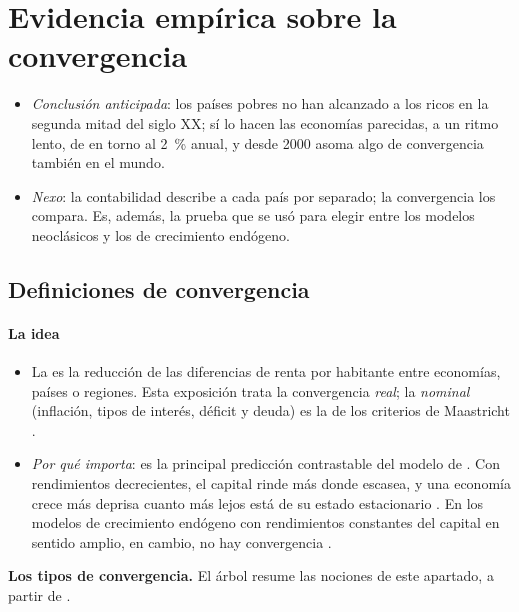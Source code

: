 \documentclass[11pt]{article}
\begin{document}
\section{Evidencia empírica sobre la convergencia}\label{sec:convergencia}

\begin{itemize}
\item \emph{Conclusión anticipada}: los países pobres no han alcanzado a los ricos en la segunda mitad del siglo XX; sí lo hacen las economías parecidas, a un ritmo lento, de en torno al 2~\% anual, y desde 2000 asoma algo de convergencia también en el mundo.
\item \emph{Nexo}: la contabilidad describe a cada país por separado; la convergencia los compara. Es, además, la prueba que se usó para elegir entre los modelos neoclásicos y los de crecimiento endógeno.
\end{itemize}

\subsection{Definiciones de convergencia}\label{sec:conv-definiciones}

\paragraph{La idea}

\begin{itemize}
\item La  es la reducción de las diferencias de renta por habitante entre economías, países o regiones. Esta exposición trata la convergencia \emph{real}; la \emph{nominal} (inflación, tipos de interés, déficit y deuda) es la de los criterios de Maastricht .
\item \emph{Por qué importa}: es la principal predicción contrastable del modelo de . Con rendimientos decrecientes, el capital rinde más donde escasea, y una economía crece más deprisa cuanto más lejos está de su estado estacionario . En los modelos de crecimiento endógeno con rendimientos constantes del capital en sentido amplio, en cambio, no hay convergencia .
\end{itemize}

\begin{anotaciones}
\textbf{Los tipos de convergencia.} El árbol resume las nociones de este apartado, a partir de \textcite{delRioCasasola2018}.
\begin{infografiacaja}
\caption{Tipos de convergencia}\label{figu:tipos-convergencia}
\end{infografiacaja}
\end{anotaciones}
\end{document}
